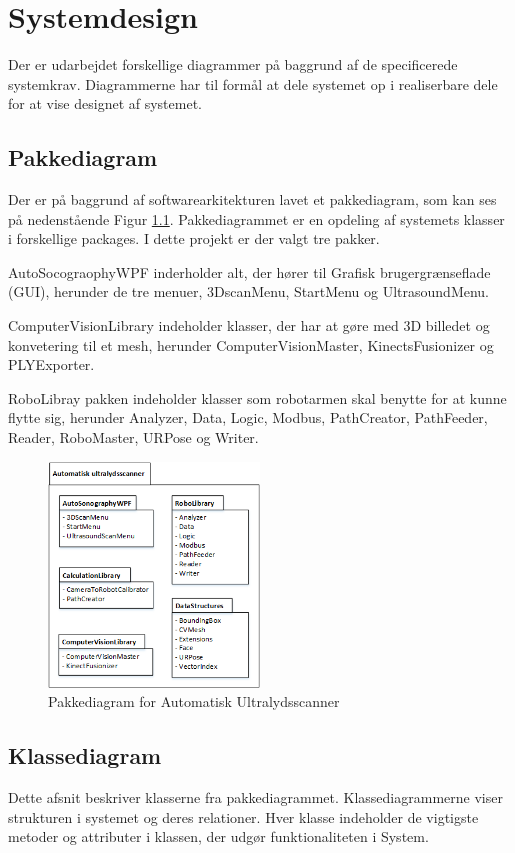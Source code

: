\chapter{Systemdesign}\label{Systemdesign}
Der er udarbejdet forskellige diagrammer på baggrund af de specificerede systemkrav.  Diagrammerne har til formål at dele systemet op i realiserbare dele for at vise designet af systemet. 

\section{Pakkediagram}
Der er på baggrund af softwarearkitekturen lavet et pakkediagram, som kan ses på nedenstående Figur \ref{Pakkediagram}. Pakkediagrammet er en opdeling af systemets klasser i forskellige packages. I dette projekt er der valgt tre pakker. 

AutoSocograophyWPF inderholder alt, der hører til Grafisk brugergrænseflade (GUI), herunder de tre menuer, 3DscanMenu, StartMenu og UltrasoundMenu. 

ComputerVisionLibrary indeholder klasser, der har at gøre med 3D billedet og konvetering til et mesh, herunder ComputerVisionMaster, KinectsFusionizer og PLYExporter. 

RoboLibray pakken indeholder klasser som robotarmen skal benytte for at kunne flytte sig, herunder Analyzer, Data, Logic, Modbus, PathCreator, PathFeeder, Reader, RoboMaster, URPose og Writer. 

\begin{figure}[H]
    \centering
    \includegraphics[width=0.5\textwidth]{figurer/d/Design/Pakkediagram}
    \caption{Pakkediagram for Automatisk Ultralydsscanner}
    \label{Pakkediagram}
\end{figure}
\newpage

\section{Klassediagram}
Dette afsnit beskriver klasserne fra pakkediagrammet. Klassediagrammerne viser strukturen i systemet og deres relationer. Hver klasse indeholder de vigtigste metoder og attributer i klassen, der udgør funktionaliteten i System. 

